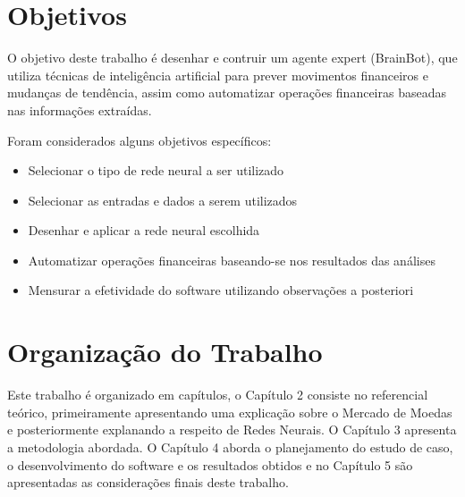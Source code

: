 \section{Objetivos}

O objetivo deste trabalho é desenhar e contruir um agente expert (BrainBot), que utiliza técnicas de inteligência artificial para prever
movimentos financeiros e mudanças de tendência, assim como automatizar operações financeiras baseadas nas informações extraídas.

Foram considerados alguns objetivos específicos:

\begin{itemize}
  \item Selecionar o tipo de rede neural a ser utilizado
  \item Selecionar as entradas e dados a serem utilizados
  \item Desenhar e aplicar a rede neural escolhida
  \item Automatizar operações financeiras baseando-se nos resultados das análises
  \item Mensurar a efetividade do software utilizando observações a posteriori
\end{itemize}

\section{Organização do Trabalho}

Este trabalho é organizado em capítulos, o Capítulo 2 consiste no referencial teórico, primeiramente apresentando uma explicação sobre
o Mercado de Moedas e posteriormente explanando a respeito de Redes Neurais. O Capítulo 3 apresenta a metodologia abordada. O Capítulo 4
aborda o planejamento do estudo de caso, o desenvolvimento do software e os resultados obtidos e no Capítulo 5 são apresentadas as considerações finais deste trabalho.


